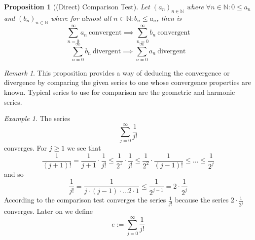 \documentclass[english,titlepage]{uzhpub}
\theoremstyle{definition}
\theoremstyle{plain}
\newtheorem{proposition}[definition]{Proposition}
\theoremstyle{remark}
\newtheorem*{remark}{Remark}
\theoremstyle{example}
\newtheorem*{example}{Example}
\begin{document}
   \begin{proposition}[(Direct) Comparison Test]\label{pro:comparison_test}
      Let \((a_n)_{n \in \mathbb{N}}\) where \(\forall n \in \mathbb{N}: 0 \leq a_n\) and \((b_n)_{n \in \mathbb{N}}\) where for almost all \(n \in \mathbb{N}: b_n \leq a_n\), then is
      \[\sum_{n=0}^\infty a_n~\text{convergent} \implies \sum_{n=0}^\infty b_n~\text{convergent}\]
      \[\sum_{n=0}^\infty b_n~\text{divergent} \implies \sum_{n=0}^\infty a_n~\text{divergent}\]
   \end{proposition}
   \begin{remark}
      This proposition provides a way of deducing the convergence or divergence by comparing the given series to one whose convergence properties are known.
      Typical series to use for comparison are the geometric and harmonic series.
   \end{remark}
   \begin{example}
      The series
      \[\sum_{j=0}^\infty \frac{1}{j!}\]
      converges.
      For \(j \geq 1\) we see that
      \[\frac{1}{(j + 1)!} = \frac{1}{j + 1} \cdot \frac{1}{j!} \leq \frac{1}{2^1} \cdot \frac{1}{j!} \leq \frac{1}{2^2} \cdot \frac{1}{(j - 1)!} \leq \ldots \leq \frac{1}{2^j}\]
      and so
      \[\frac{1}{j!} = \frac{1}{j \cdot (j - 1) \cdot \ldots 2 \cdot 1} \leq \frac{1}{2^{j-1}} = 2 \cdot \frac{1}{2^j}\]
      According to the comparison test converges the series \(\frac{1}{j!}\) because the series \(2 \cdot \frac{1}{2^j}\) converges.
      Later on we define
      \[e := \sum_{j=0}^\infty \frac{1}{j!}\]
   \end{example}
\end{document}
